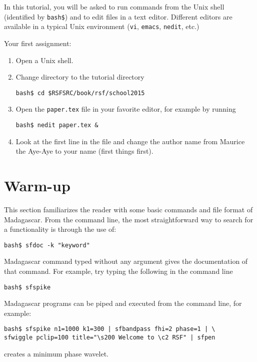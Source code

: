 In this tutorial, you will be asked to run commands from the Unix
shell (identified by \texttt{bash\$}) and to edit files in a text
editor. Different editors are available in a typical Unix environment
(\texttt{vi}, \texttt{emacs}, \texttt{nedit}, etc.)

Your first assignment:
\begin{enumerate}
\item Open a Unix shell.
\item Change directory to the tutorial directory
\begin{verbatim}
bash$ cd $RSFSRC/book/rsf/school2015
\end{verbatim}
\item Open the \texttt{paper.tex} file in your favorite editor, for example by
running
\begin{verbatim}
bash$ nedit paper.tex & 
\end{verbatim}
\item Look at the first line in the file and change the author name from Maurice the Aye-Aye to your name (first things first). 
\end{enumerate}

\section{Warm-up}
This section familiarizes the reader with some basic commands and
file format of Madagascar. From the command line, the most
straightforward way to search for a functionality is through the use of:
\begin{verbatim}
bash$ sfdoc -k "keyword"
\end{verbatim}
Madagascar command typed without any argument gives the documentation
of that command. For example, try typing the following in the command line
\begin{verbatim}
bash$ sfspike
\end{verbatim}
Madagascar programs can be piped and executed from the command line,
for example:
\begin{verbatim}
bash$ sfspike n1=1000 k1=300 | sfbandpass fhi=2 phase=1 | \
sfwiggle pclip=100 title="\s200 Welcome to \c2 RSF" | sfpen
\end{verbatim}
creates a minimum phase wavelet.
 
